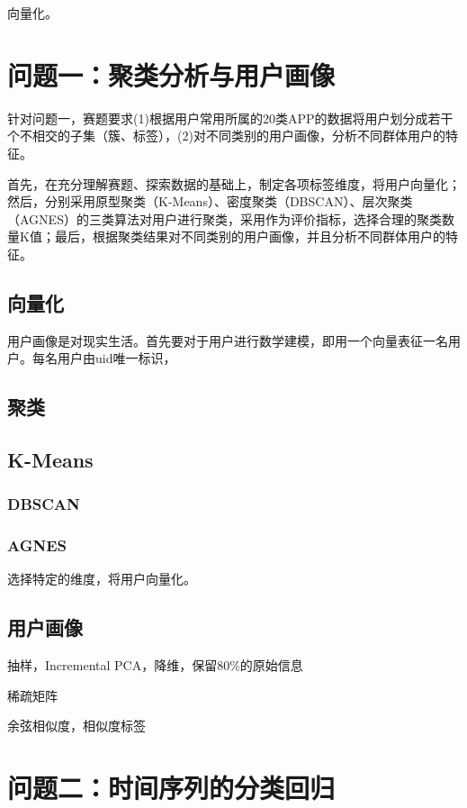 \documentclass[withoutpreface,bwprint]{cumcmthesis}
\begin{document}
向量化。

\newpage
\section{问题一：聚类分析与用户画像}

针对问题一，赛题要求(1)根据用户常用所属的20类APP的数据将用户划分成若干个不相交的子集（簇、标签），(2)对不同类别的用户画像，分析不同群体用户的特征。

首先，在充分理解赛题、探索数据的基础上，制定各项标签维度，将用户向量化；然后，分别采用原型聚类（K-Means）、密度聚类（DBSCAN）、层次聚类（AGNES）的三类算法对用户进行聚类，采用作为评价指标，选择合理的聚类数量K值；最后，根据聚类结果对不同类别的用户画像，并且分析不同群体用户的特征。

\subsection{向量化}

用户画像是对现实生活。首先要对于用户进行数学建模，即用一个向量表征一名用户。每名用户由uid唯一标识，

\subsection{聚类}

\subsection{K-Means}

\subsubsection{DBSCAN}

\subsubsection{AGNES}

选择特定的维度，将用户向量化。

\subsection{用户画像}

抽样，Incremental PCA，降维，保留80\%的原始信息

稀疏矩阵

余弦相似度，相似度标签

\newpage
\section{问题二：时间序列的分类回归}
\end{document}
